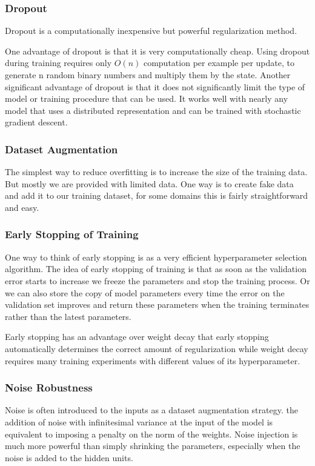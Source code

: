 \subsubsection{Dropout}
Dropout is a computationally inexpensive but powerful regularization method.

One advantage of dropout is that it is very computationally cheap. Using dropout during training requires only $ O(n) $ computation per example per update, to generate n random binary numbers and multiply them by the state. Another significant advantage of dropout is that it does not significantly limit the type of model or training procedure that can be used. It works well with nearly any model that uses a distributed representation and can be trained with stochastic gradient descent.


\subsubsection{Dataset Augmentation}
The simplest way to reduce overfitting is to increase the size of the training data. But mostly we are provided with limited data. One way is to create fake data and add it to our training dataset, for some domains this is fairly straightforward and easy.

\subsubsection{Early Stopping of Training}
One way to think of early stopping is as a very efficient hyperparameter selection algorithm. The idea of early stopping of training is that as soon as the validation error starts to increase we freeze the parameters and stop the training process. Or we can also store the copy of model parameters every time the error on the validation set improves and return these parameters when the training terminates rather than the latest parameters.

Early stopping has an advantage over weight decay that early stopping automatically determines the correct amount of regularization while weight decay requires many training experiments with different values of its hyperparameter.


\subsubsection{Noise Robustness}
Noise is often introduced to the inputs as a dataset augmentation strategy. the addition of noise with infinitesimal variance at the input of the model is equivalent to imposing a penalty on the norm of the weights. Noise injection is much more powerful than simply shrinking the parameters, especially when the noise is added to the hidden units.

